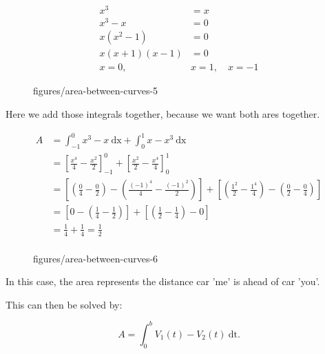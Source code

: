 \documentclass{book}
\begin{document}

\begin{align*}
    x^3&= x \\
    x^3-x&= 0 \\
    x(x^2-1)&= 0 \\
    x(x+1)(x-1)&=0 \\
    x=0 ,\quad & x=1, \quad  x=-1
\end{align*}


\begin{figure}[htbp]
    \centering
    \caption{figures/area-between-curves-5}
    \label{fig:area-between-curves-5}
\end{figure}

Here we add those integrals together, because we want both ares together.

\begin{align*}
    A&= \int_{-1}^{0} x^3-x \ \text{dx} + \int_{0}^{1} x-x^3 \ \text{dx}   \\
    &= \left[  \frac{x^4}{4}-\frac{x^2}{2} \right]^0_{-1} + \left[ \frac{x^2}{2}-\frac{x^4}{4} \right]^1_0  \\
    &= \left[ \left( \frac{0}{4}- \frac{0}{2} \right) - \left( \frac{(-1)^4}{4}- \frac{(-1)^2}{2} \right)  \right]+ 
    \left[ \left( \frac{1^2}{2}- \frac{1^4}{4} \right)- \left( \frac{0}{2}- \frac{0}{4} \right)   \right]  \\
    &= \left[ 0-\left( \frac{1}{4} - \frac{1}{2} \right)  \right] + \left[ \left( \frac{1}{2}-\frac{1}{4} \right) -0 \right]  \\
    &= \frac{1}{4}+\frac{1}{4}= \frac{1}{2} \\
\end{align*}


\begin{figure}[ht]
    \centering
    \caption{figures/area-between-curves-6}
    \label{fig:area-between-curves-6}
\end{figure}

In this case, the area represents the distance car 'me' is ahead of car 'you'.

This can then be solved by:

\[
A=\int_{0}^{b} V_1(t) - V_2(t) \ \text{dt}
.\] 
\end{document}
